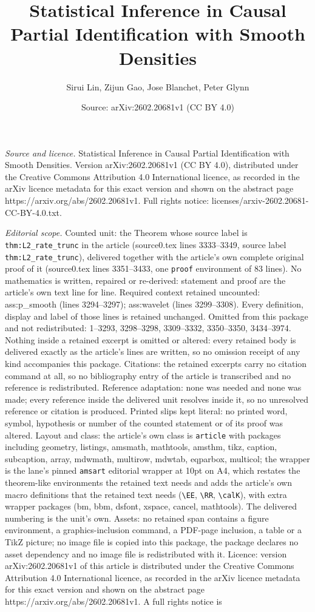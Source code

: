 \documentclass[10pt,a4paper]{amsart}
\title[Statistical Inference in Causal Partial Identification with ]{Statistical Inference in Causal Partial Identification with Smooth Densities}
\author{Sirui Lin, Zijun Gao, Jose Blanchet, Peter Glynn}
\date{Source: arXiv:2602.20681v1 (CC BY 4.0)}
\begin{document}
\maketitle

\noindent\emph{Source and licence.} Statistical Inference in Causal Partial Identification with Smooth Densities. Version arXiv:2602.20681v1 (CC BY 4.0), distributed under the Creative Commons Attribution 4.0 International licence, as recorded in the arXiv licence metadata for this exact version and shown on the abstract page https://arxiv.org/abs/2602.20681v1. Full rights notice: licenses/arxiv-2602.20681-CC-BY-4.0.txt.\par\smallskip

\noindent\textit{Editorial scope.} Counted unit: the Theorem whose source label is \texttt{thm:L2\_rate\_trunc} in the article (source0.tex lines 3333--3349, source label \texttt{thm:L2\_rate\_trunc}), delivered together with the article's own complete original proof of it (source0.tex lines 3351--3433, one \texttt{proof} environment of 83 lines). No mathematics is written, repaired or re-derived: statement and proof are the article's own text line for line. Required context retained uncounted: ass:p\_smooth (lines 3294--3297); ass:wavelet (lines 3299--3308). Every definition, display and label of those lines is retained unchanged. Omitted from this package and not redistributed: 1--3293, 3298--3298, 3309--3332, 3350--3350, 3434--3974. Nothing inside a retained excerpt is omitted or altered: every retained body is delivered exactly as the article's lines are written, so no omission receipt of any kind accompanies this package. Citations: the retained excerpts carry no citation command at all, so no bibliography entry of the article is transcribed and no reference is redistributed. Reference adaptation: none was needed and none was made; every reference inside the delivered unit resolves inside it, so no unresolved reference or citation is produced. Printed slips kept literal: no printed word, symbol, hypothesis or number of the counted statement or of its proof was altered. Layout and class: the article's own class is \texttt{article} with packages including geometry, listings, amsmath, mathtools, amsthm, tikz, caption, subcaption, array, mdwmath, multirow, mdwtab, eqparbox, multicol; the wrapper is the lane's pinned \texttt{amsart} editorial wrapper at 10pt on A4, which restates the theorem-like environments the retained text needs and adds the article's own macro definitions that the retained text needs (\texttt{\textbackslash EE}, \texttt{\textbackslash RR}, \texttt{\textbackslash calK}), with extra wrapper packages (bm, bbm, dsfont, xspace, cancel, mathtools). The delivered numbering is the unit's own. Assets: no retained span contains a figure environment, a graphics-inclusion command, a PDF-page inclusion, a table or a TikZ picture; no image file is copied into this package, the package declares no asset dependency and no image file is redistributed with it. Licence: version arXiv:2602.20681v1 of this article is distributed under the Creative Commons Attribution 4.0 International licence, as recorded in the arXiv licence metadata for this exact version and shown on the abstract page https://arxiv.org/abs/2602.20681v1. A full rights notice is 
\end{document}
